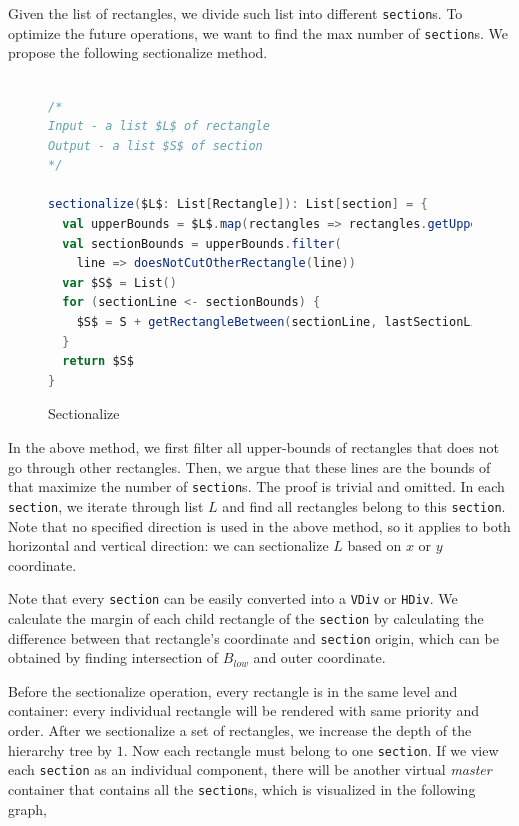 \documentclass[runningheads]{llncs}
\begin{document}
Given the list of rectangles, we divide such list into different \lstinline{section}s. To optimize the future operations, we want to find the max number of \lstinline{section}s. We propose the following sectionalize method.

\begin{figure}[H]
  \vspace*{-0.4in}
  \begin{lstlisting}[language=Scala,mathescape=true]

/*
Input - a list $L$ of rectangle
Output - a list $S$ of section
*/

sectionalize($L$: List[Rectangle]): List[section] = {
  val upperBounds = $L$.map(rectangles => rectangles.getUpperBound())
  val sectionBounds = upperBounds.filter(
    line => doesNotCutOtherRectangle(line))
  var $S$ = List()
  for (sectionLine <- sectionBounds) {
    $S$ = S + getRectangleBetween(sectionLine, lastSectionLine)
  }
  return $S$ 
}
  \end{lstlisting}
\caption{Sectionalize}
\end{figure}
In the above method, we first filter all upper-bounds of rectangles that does not go through other rectangles. Then, we argue that these lines are the bounds of that maximize the number of \lstinline{section}s. The proof is trivial and omitted. In each \lstinline{section}, we iterate through list $L$ and find all rectangles belong to this \lstinline{section}. Note that no specified direction is used in the above method, so it applies to both horizontal and vertical direction: we can sectionalize $L$ based on $x$ or $y$ coordinate.

Note that every \lstinline{section} can be easily converted into a \lstinline{VDiv} or \lstinline{HDiv}. We calculate the margin of each child rectangle of the \lstinline{section} by calculating the difference between that rectangle's coordinate and \lstinline{section} origin, which can be obtained by finding intersection of $B_{low}$ and outer coordinate.

Before the sectionalize operation, every rectangle is in the same level and container: every individual rectangle will be rendered with same priority and order. After we sectionalize a set of rectangles, we increase the depth of the hierarchy tree by $1$. Now each rectangle must belong to one \lstinline{section}. If we view each \lstinline{section} as an individual component, there will be another virtual \textit{master} container that contains all the \lstinline{section}s, which is visualized in the following graph,
\end{document}
